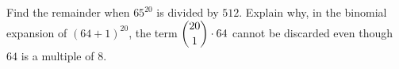 Find the remainder when $65^{20}$ is divided by $512$. Explain why, in the binomial expansion of $(64+1)^{20}$, the term $\dbinom{20}{1}\cdot64$ cannot be discarded even though $64$ is a multiple of $8$.
